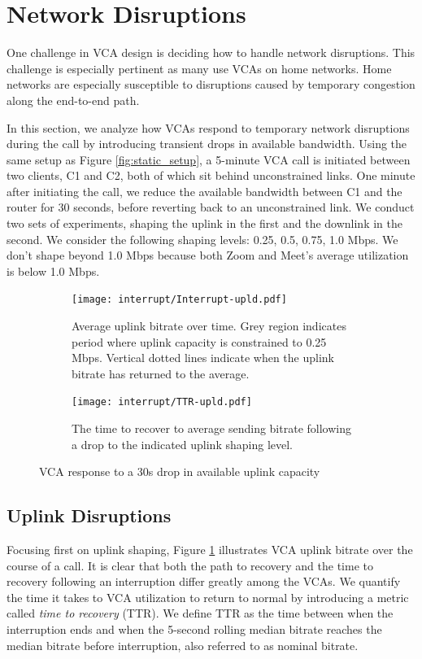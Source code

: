 

\section{Network Disruptions}
\label{sec:interruption}
One challenge in VCA design is deciding how to handle network disruptions. This challenge is especially pertinent as many use VCAs on home networks. Home networks are especially susceptible to disruptions caused by temporary congestion along the end-to-end path.

In this section, we analyze how VCAs respond to temporary network disruptions during the call by introducing transient drops in available bandwidth. Using the same setup as Figure \ref{fig:static_setup}, a 5-minute VCA call is initiated between two clients, C1 and C2, both of which sit behind unconstrained links. One minute after initiating the call, we reduce the available bandwidth between C1 and the router for 30 seconds, before reverting back to an unconstrained link. We conduct two sets of experiments, shaping the uplink in the first and the downlink in the second. We consider the following shaping levels: {0.25, 0.5, 0.75, 1.0} Mbps. We don't shape beyond 1.0 Mbps because both Zoom and Meet's average utilization is below 1.0 Mbps.

\begin{figure}[t!]
\centering
\begin{subfigure}[t]{.5\textwidth}
    \centering
    \texttt{[image: interrupt/Interrupt-upld.pdf]}
    \caption{Average uplink bitrate over time. Grey region indicates period where uplink capacity is constrained to 0.25 Mbps. Vertical dotted lines indicate when the uplink bitrate has returned to the average.}
    \label{fig:ts_upld}
\end{subfigure}\hfill
\begin{subfigure}[t]{.5\textwidth}
      \centering
    \texttt{[image: interrupt/TTR-upld.pdf]}
    \caption{The time to recover to average sending bitrate following a drop to the indicated uplink shaping level.}
    \label{fig:TTR_upld}
\end{subfigure}
\caption{VCA response to a 30s drop in available uplink capacity}
\label{fig:interrupt-upld}
\end{figure}

\subsection{Uplink Disruptions}
Focusing first on uplink shaping, Figure \ref{fig:ts_upld} illustrates VCA uplink bitrate over the course of a call. It is clear that both the path to recovery and the time to recovery following an interruption differ greatly among the VCAs. We quantify the time it takes to VCA utilization to return to normal by introducing a metric called \textit{time to recovery} (TTR). We define TTR as the time between when the interruption ends and when the 5-second rolling median bitrate reaches the median bitrate before interruption, also referred to as nominal bitrate. %

